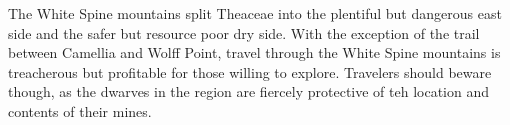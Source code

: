 The White Spine mountains split Theaceae into the plentiful but dangerous east side and the safer but resource poor dry side.
With the exception of the trail between Camellia and Wolff Point, travel through the White Spine mountains is treacherous but profitable for those willing to explore.
Travelers should beware though, as the dwarves in the region are fiercely protective of teh location and contents of their mines.
